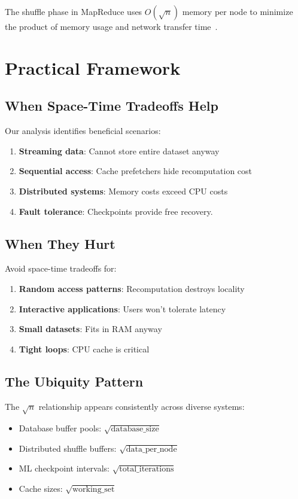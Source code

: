 \documentclass[11pt]{article}
\theoremstyle{definition}
\begin{document}
The shuffle phase in MapReduce uses $O(\sqrt{n})$ memory per node to minimize the product of memory usage and network transfer time~\cite{dean2008mapreduce}.

\section{Practical Framework}
\label{sec:framework}

\subsection{When Space-Time Tradeoffs Help}

Our analysis identifies beneficial scenarios:

\begin{enumerate}
\item \textbf{Streaming data}: Cannot store entire dataset anyway
\item \textbf{Sequential access}: Cache prefetchers hide recomputation cost
\item \textbf{Distributed systems}: Memory costs exceed CPU costs
\item \textbf{Fault tolerance}: Checkpoints provide free recovery.
\end{enumerate}

\subsection{When They Hurt}

Avoid space-time tradeoffs for:

\begin{enumerate}
\item \textbf{Random access patterns}: Recomputation destroys locality
\item \textbf{Interactive applications}: Users won't tolerate latency
\item \textbf{Small datasets}: Fits in RAM anyway
\item \textbf{Tight loops}: CPU cache is critical
\end{enumerate}

\subsection{The Ubiquity Pattern}

The $\sqrt{n}$ relationship appears consistently across diverse systems:
\begin{itemize}
\item Database buffer pools: $\sqrt{\text{database\_size}}$
\item Distributed shuffle buffers: $\sqrt{\text{data\_per\_node}}$
\item ML checkpoint intervals: $\sqrt{\text{total\_iterations}}$
\item Cache sizes: $\sqrt{\text{working\_set}}$
\end{itemize}
\end{document}
